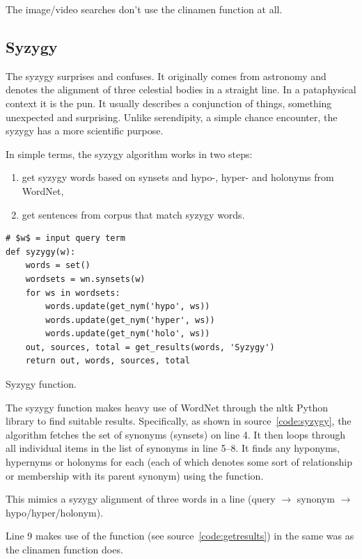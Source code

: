The image/video searches don't use the clinamen function at all.


\subsection{Syzygy}

The syzygy surprises and confuses. It originally comes from astronomy and denotes the alignment of three celestial bodies in a straight line. In a pataphysical context it is the pun. It usually describes a conjunction of things, something unexpected and surprising. Unlike serendipity, a simple chance encounter, the syzygy has a more scientific purpose.

In simple terms, the syzygy algorithm works in two steps:
\begin{enumerate}
  \item get syzygy words based on synsets and hypo-, hyper- and holonyms from WordNet,
  \item get sentences from corpus that match syzygy words.
\end{enumerate}

\begin{listing}
  \begin{verbatim}
# $w$ = input query term
def syzygy(w):
    words = set()
    wordsets = wn.synsets(w)
    for ws in wordsets:
        words.update(get_nym('hypo', ws))
        words.update(get_nym('hyper', ws))
        words.update(get_nym('holo', ws))
    out, sources, total = get_results(words, 'Syzygy')
    return out, words, sources, total
  \end{verbatim}
\caption{Syzygy function.}
\label{code:syzygy}
\end{listing}

The syzygy function makes heavy use of WordNet \parencite{Miller1995} through the \gls{nltk} Python library to find suitable results. Specifically, as shown in source~\ref{code:syzygy}, the algorithm fetches the set of synonyms (synsets) on line 4. It then loops through all individual items  in the list of synonyms  in line 5--8. It finds any hyponyms, hypernyms or holonyms for each  (each of which denotes some sort of relationship or membership with its parent synonym) using the  function.

This mimics a syzygy alignment of three words in a line (query $\to$ synonym $\to$ hypo/hyper/holonym).

Line 9 makes use of the  function (see source~\ref{code:getresults}) in the same was as the clinamen function does.

